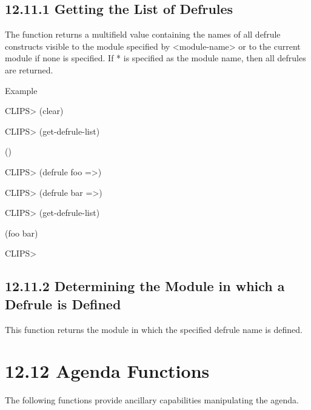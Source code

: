 \documentclass[letterpaper,10pt,english]{sphinxmanual}
\begin{document}
\subsection{12.11.1 Getting the List of Defrules}
\label{\detokenize{actions:getting-the-list-of-defrules}}
The function  returns a multifield value containing
the names of all defrule constructs visible to the module specified by
\textless{}module-name\textgreater{} or to the current module if none is specified. If * is
specified as the module name, then all defrules are returned.


\begin{sphinxVerbatim}[commandchars=\\\{\}]
\end{sphinxVerbatim}

Example

CLIPS\textgreater{} (clear)

CLIPS\textgreater{} (get-defrule-list)

()

CLIPS\textgreater{} (defrule foo =\textgreater{})

CLIPS\textgreater{} (defrule bar =\textgreater{})

CLIPS\textgreater{} (get-defrule-list)

(foo bar)

CLIPS\textgreater{}


\subsection{12.11.2 Determining the Module in which a Defrule is Defined}
\label{\detokenize{actions:determining-the-module-in-which-a-defrule-is-defined}}
This function returns the module in which the specified defrule name is
defined.


\begin{sphinxVerbatim}[commandchars=\\\{\}]
 
\end{sphinxVerbatim}


\section{12.12 Agenda Functions}
\label{\detokenize{actions:agenda-functions}}
The following functions provide ancillary capabilities manipulating the
agenda.
\end{document}
